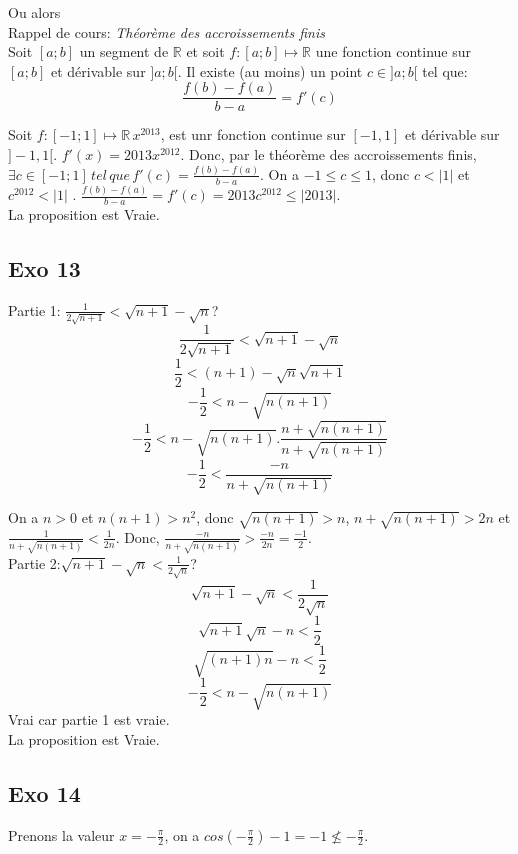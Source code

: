 \documentclass[]{book}
\theoremstyle{definition}
\newcommand{\bb}[1]{\mathbb{#1}}
\newcommand{\R}{\bb{R}}
\begin{document}
Ou alors\\
Rappel de cours: \emph{Th\'eor\`eme des accroissements finis}\\

Soit $[a; b]$ un segment de $\R$ et soit $f : [a; b] \mapsto \R$ une fonction continue sur $[a; b]$ et dérivable sur $]a; b[$. Il existe (au moins) un point $c \in ]a; b[$ tel que:
$$\frac{f(b) - f(a)}{b - a} = f'(c)$$


Soit $f: [-1;1] \mapsto \R\, x^{2013}$, est unr fonction continue sur $[-1,1]$ et d\'erivable sur $]-1,1[$. $f'(x)=2013x^{2012}$. Donc, par le th\'eor\`eme des accroissements finis, $\exists c \in [-1;1]\, tel\, que\, f'(c) = \frac{f(b) - f(a)}{b - a}$. On a $-1 \leq c \leq 1$, donc $c < |1|$ et $c^{2012} < |1|$ . $\frac{f(b) - f(a)}{b - a} = f'(c) = 2013c^{2012} \leq |2013|$.\\
 

La proposition est Vraie.

\subsection*{Exo 13}
Partie 1: $\frac{1}{2\sqrt{n+1}} < \sqrt{n+1}-\sqrt{n}$?\\
$$\frac{1}{2\sqrt{n+1}} < \sqrt{n+1}-\sqrt{n}$$
$$\frac{1}{2} < (n+1)-\sqrt{n}\sqrt{n+1}$$
$$-\frac{1}{2} < n-\sqrt{n(n+1)}$$
$$-\frac{1}{2} < n-\sqrt{n(n+1)}.\frac{n+\sqrt{n(n+1)}}{n+\sqrt{n(n+1)}}$$
$$-\frac{1}{2} < \frac{-n}{n+\sqrt{n(n+1)}}$$

On a $n>0$ et $n(n+1)>n^2$, donc $\sqrt{n(n+1)}>n$, $n+\sqrt{n(n+1)}>2n$ et $\frac{1}{n+\sqrt{n(n+1)}}<\frac{1}{2n}$. Donc, $\frac{-n}{n+\sqrt{n(n+1)}}>\frac{-n}{2n}=\frac{-1}{2}$.\\


Partie 2:$\sqrt{n+1}-\sqrt{n} < \frac{1}{2\sqrt{n}}$?\\
$$\sqrt{n+1}-\sqrt{n} < \frac{1}{2\sqrt{n}}$$
$$\sqrt{n+1}\sqrt{n} -n < \frac{1}{2}$$
$$\sqrt{(n+1)n} -n < \frac{1}{2}$$
$$-\frac{1}{2} < n-\sqrt{n(n+1)}$$
Vrai car partie 1 est vraie.\\

La proposition est Vraie.

\subsection*{Exo 14}
Prenons la valeur $x = -\frac{\pi}{2}$, on a $cos(-\frac{\pi}{2})-1 = -1 \nleq -\frac{\pi}{2}$.\\
\end{document}
